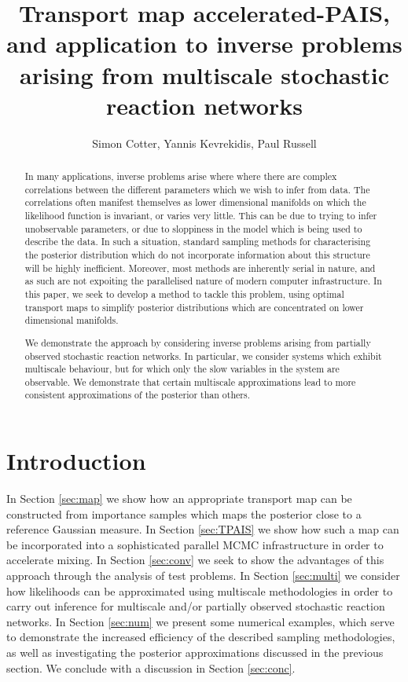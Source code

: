 \documentclass[final]{siamltex}
\title{Transport map accelerated-PAIS, and application to inverse problems arising from
  multiscale stochastic reaction networks}
\author{Simon Cotter, Yannis Kevrekidis, Paul Russell}
\begin{document}
\maketitle
\begin{abstract}
In many applications, inverse problems arise where where there are
complex correlations between the different parameters which we wish to
infer from data. The correlations often manifest themselves as lower
dimensional manifolds on which the likelihood function is
invariant, or varies very little. This can be due to trying to infer
unobservable parameters, or due to sloppiness in the model which is
being used to describe the data. In such a situation, standard
sampling methods for characterising the posterior distribution which
do not incorporate information about this structure will be highly
inefficient. Moreover, most methods are inherently serial in nature,
and as such are not expoiting the parallelised  nature of modern
computer infrastructure. In this paper, we seek to develop a method to
tackle this problem, using optimal transport maps to simplify
posterior distributions which are concentrated on lower dimensional
manifolds.

We demonstrate the approach by considering inverse problems arising
from partially observed stochastic reaction networks. In particular,
we consider systems which exhibit multiscale behaviour, but for which
only the slow variables in the system are observable. We demonstrate
that certain multiscale approximations lead to more consistent
approximations of the posterior than others.
\end{abstract}


\section{Introduction}

In Section \ref{sec:map} we show how an appropriate transport map can
be constructed from importance samples which maps the posterior close
to a reference Gaussian measure. In Section \ref{sec:TPAIS} we show
how such a map can be incorporated into a sophisticated parallel MCMC
infrastructure in order to accelerate mixing. In Section
\ref{sec:conv} we seek to show the advantages of this approach through
the analysis of test problems. In Section
\ref{sec:multi} we consider how likelihoods can be approximated using
 multiscale methodologies in order to carry out inference for
multiscale and/or partially observed stochastic reaction networks. In
Section \ref{sec:num} we present some numerical examples, which serve
to demonstrate the increased efficiency of the described sampling
methodologies, as well as investigating the posterior approximations
discussed in the previous section. We conclude with a discussion in
Section \ref{sec:conc}.
\end{document}
